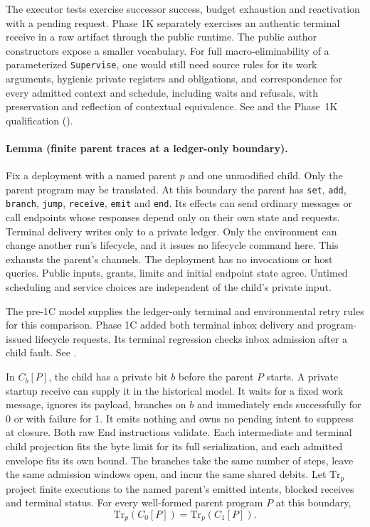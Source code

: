\documentclass[11pt,a4paper]{article}
\theoremstyle{definition}
\theoremstyle{remark}
\begin{document}
The executor tests exercise successor success, budget exhaustion and reactivation with a pending request. Phase 1K separately exercises an authentic terminal receive in a raw artifact through the public runtime. The public author constructors expose a smaller vocabulary. For full macro-eliminability of a parameterized \texttt{Supervise}, one would still need source rules for its work arguments, hygienic private registers and obligations, and correspondence for every admitted context and schedule, including waits and refusals, with preservation and reflection of contextual equivalence. See  and the Phase~1K qualification ().

\paragraph{Lemma (finite parent traces at a ledger-only boundary).} Fix a deployment with a named parent $p$ and one unmodified child. Only the parent program may be translated. At this boundary the parent has \texttt{set}, \texttt{add}, \texttt{branch}, \texttt{jump}, \texttt{receive}, \texttt{emit} and \texttt{end}. Its effects can send ordinary messages or call endpoints whose responses depend only on their own state and requests. Terminal delivery writes only to a private ledger. Only the environment can change another run's lifecycle, and it issues no lifecycle command here. This exhausts the parent's channels. The deployment has no invocations or host queries. Public inputs, grants, limits and initial endpoint state agree. Untimed scheduling and service choices are independent of the child's private input.

The pre-1C model supplies the ledger-only terminal and environmental retry rules for this comparison. Phase 1C added both terminal inbox delivery and program-issued lifecycle requests. Its terminal regression checks inbox admission after a child fault. See .

In $C_b[P]$, the child has a private bit $b$ before the parent $P$ starts. A private startup receive can supply it in the historical model. It waits for a fixed work message, ignores its payload, branches on $b$ and immediately ends successfully for 0 or with failure for 1. It emits nothing and owns no pending intent to suppress at closure. Both raw End instructions validate. Each intermediate and terminal child projection fits the byte limit for its full serialization, and each admitted envelope fits its own bound. The branches take the same number of steps, leave the same admission windows open, and incur the same shared debits. Let $\mathrm{Tr}_p$ project finite executions to the named parent's emitted intents, blocked receives and terminal status. For every well-formed parent program $P$ at this boundary,
\[\mathrm{Tr}_p(C_0[P])=\mathrm{Tr}_p(C_1[P]).\]
\end{document}
